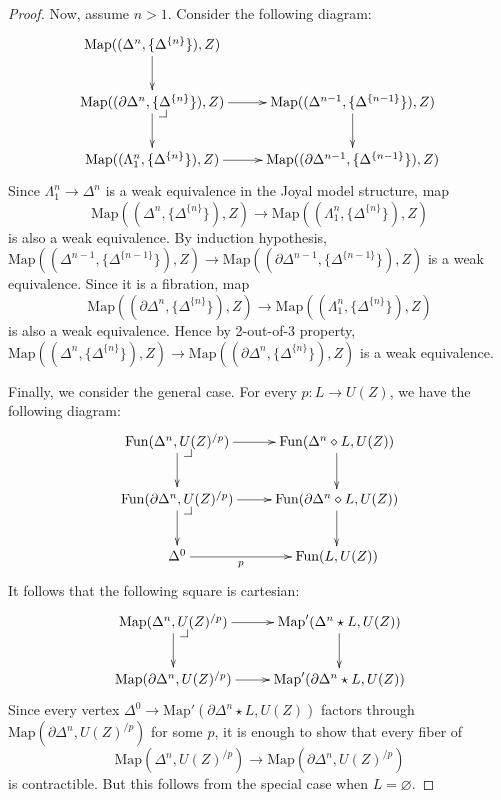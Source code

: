 \documentclass[reqno]{amsart}
\makeatletter
\theoremstyle{definition}
\theoremstyle{remark}
\newcommand{\join}{\star}
\newcommand{\fjoin}{\diamond}
\newcommand{\Map}{\mathrm{Map}}
\newcommand{\Fun}{\mathrm{Fun}}
\numberwithin{figure}{section}
\newcommand{\pb}[1][dr]{\save*!/#1-1.2pc/#1:(-1,1)@^{|-}\restore}
\makeatother
\begin{document}
\begin{proof}
Now, assume $n > 1$.
Consider the following diagram:
\[ \xymatrix{ \Map((\Delta^n, \{ \Delta^{\{n\}} \}), Z) \ar[d] \\
              \Map((\partial \Delta^n, \{ \Delta^{\{n\}} \}), Z) \ar[r] \ar[d] \pb & \Map((\Delta^{n-1}, \{ \Delta^{\{n-1\}} \}), Z) \ar[d] \\
              \Map((\Lambda^n_1, \{ \Delta^{\{n\}} \}), Z) \ar[r] & \Map((\partial \Delta^{n-1}, \{ \Delta^{\{n-1\}} \}), Z)
            } \]
Since $\Lambda^n_1 \to \Delta^n$ is a weak equivalence in the Joyal model structure, map
\[ \Map((\Delta^n, \{ \Delta^{\{n\}} \}), Z) \to \Map((\Lambda^n_1, \{ \Delta^{\{n\}} \}), Z) \]
is also a weak equivalence.
By induction hypothesis, $\Map((\Delta^{n-1}, \{ \Delta^{\{n-1\}} \}), Z) \to \Map((\partial \Delta^{n-1}, \{ \Delta^{\{n-1\}} \}), Z)$ is a weak equivalence.
Since it is a fibration, map
\[ \Map((\partial \Delta^n, \{ \Delta^{\{n\}} \}), Z) \to \Map((\Lambda^n_1, \{ \Delta^{\{n\}} \}), Z) \]
is also a weak equivalence.
Hence by 2-out-of-3 property, $\Map((\Delta^n, \{ \Delta^{\{n\}} \}), Z) \to \Map((\partial \Delta^n, \{ \Delta^{\{n\}} \}), Z)$ is a weak equivalence.

Finally, we consider the general case.
For every $p : L \to U(Z)$, we have the following diagram:
\[ \xymatrix{ \Fun(\Delta^n, U(Z)^{/p}) \ar[r] \ar[d] \pb & \Fun(\Delta^n \fjoin L, U(Z)) \ar[d] \\
              \Fun(\partial \Delta^n, U(Z)^{/p}) \ar[r] \ar[d] \pb & \Fun(\partial \Delta^n \fjoin L, U(Z)) \ar[d] \\
              \Delta^0 \ar[r]_-p & \Fun(L,U(Z))
            } \]
It follows that the following square is cartesian:
\[ \xymatrix{ \Map(\Delta^n, U(Z)^{/p}) \ar[r] \ar[d] \pb & \Map'(\Delta^n \join L, U(Z)) \ar[d] \\
              \Map(\partial \Delta^n, U(Z)^{/p}) \ar[r] & \Map'(\partial \Delta^n \join L, U(Z))
            } \]
Since every vertex $\Delta^0 \to \Map'(\partial \Delta^n \join L, U(Z))$ factors through $\Map(\partial \Delta^n, U(Z)^{/p})$
for some $p$, it is enough to show that every fiber of \[ \Map(\Delta^n, U(Z)^{/p}) \to \Map(\partial \Delta^n, U(Z)^{/p}) \] is contractible.
But this follows from the special case when $L = \varnothing$.
\end{proof}
\end{document}
